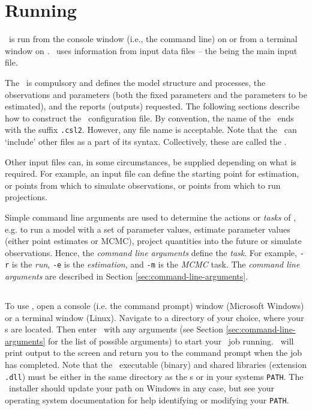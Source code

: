 \section{Running \CNAME\label{sec:running}}

\CNAME\ is run from the console window (i.e., the command line) on  or from a terminal window on . \CNAME\ uses information from input data files -- the \emph{\config{}} being the main input file.

The \config\ is compulsory and defines the model structure and processes, the observations and  parameters (both the fixed parameters and the parameters to be estimated), and the reports (outputs) requested. The following sections  describe how to construct the \CNAME\ configuration file. By convention, the name of the \config\ ends with the suffix \texttt{.csl2}. However, any file name is acceptable. Note that the \config\ can `include' other files as a part of its syntax. Collectively, these are called the \config.

Other input files can, in some circumstances, be supplied depending on what is required. For example, an input file can define the starting point for estimation, or points from which to simulate observations, or points from which to run projections.

Simple command line arguments are used to determine the actions or \emph{tasks} of \CNAME, e.g. to run a model with a set of parameter values, estimate parameter values (either point estimates or MCMC), project quantities into the future or simulate observations. Hence, the \emph{command line arguments} define the \emph{task}. For example, \texttt{-r} is the \emph{run}, \texttt{-e} is the \emph{estimation}, and \texttt{-m} is the \emph{MCMC} task. The \emph{command line arguments} are described in Section \ref{sec:command-line-arguments}.

\subsection{}

To use \CNAME, open a console (i.e. the command prompt) window (Microsoft Windows) or a terminal window (Linux). Navigate to a directory of your choice, where your \config s are located. Then enter \cname\ with any arguments (see Section \ref{sec:command-line-arguments} for the list of possible arguments) to start your \CNAME\ job running. \CNAME\ will print output to the screen and return you to the command prompt when the job has completed. Note that the \CNAME\ executable (binary) and shared libraries (extension \texttt{.dll}) must be either in the same directory as the \config s or in your systems \texttt{PATH}. The \CNAME\ installer should update your path on Windows in any case, but see your operating system documentation for help identifying or modifying your \texttt{PATH}.

